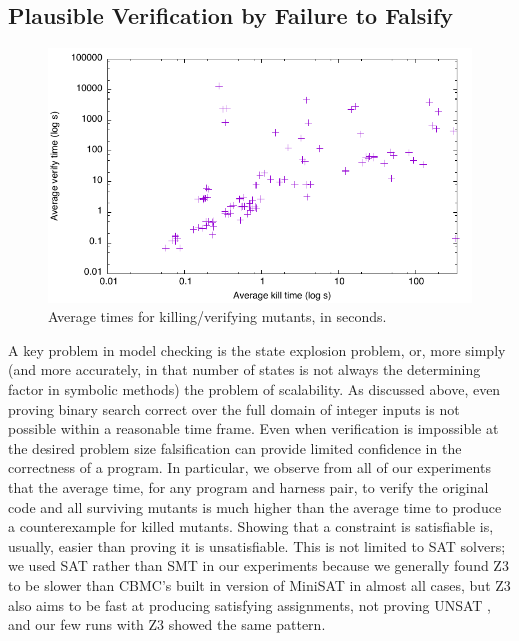 \documentclass{svjour3}
\begin{document}

\subsection{Plausible Verification by Failure to Falsify}
\label{sec:sattimes}

\begin{figure}
\includegraphics[width=\columnwidth]{sattimes}
\caption{Average times for killing/verifying mutants, in seconds.}
\label{fig:sattimes}
\end{figure}

A key problem in model checking is the state explosion problem, or,
more simply (and more accurately, in that number of states is not
always the determining factor in symbolic methods) the problem of
scalability.  As discussed above, even proving binary search correct
over the full domain of integer inputs is not possible within a
reasonable time frame.  Even when verification is impossible at the
desired problem size falsification can provide limited
confidence in the correctness of a program.  In particular, we observe
from all of our experiments that the average time, for any program and
harness pair, to verify the original code and all surviving mutants is
much higher than the average time to produce a counterexample
for killed mutants.  Showing that a constraint is satisfiable is,
usually, easier than proving it is unsatisfiable.  This is not limited
to SAT solvers; we used SAT rather than SMT in our experiments because
we generally found Z3 to be slower than CBMC's built in version of
MiniSAT\cite{minisat} in almost all cases, but Z3 also
aims to be fast at producing satisfying assignments, not proving UNSAT
\cite{z3}, and our few runs with Z3 showed the same pattern.
\end{document}
